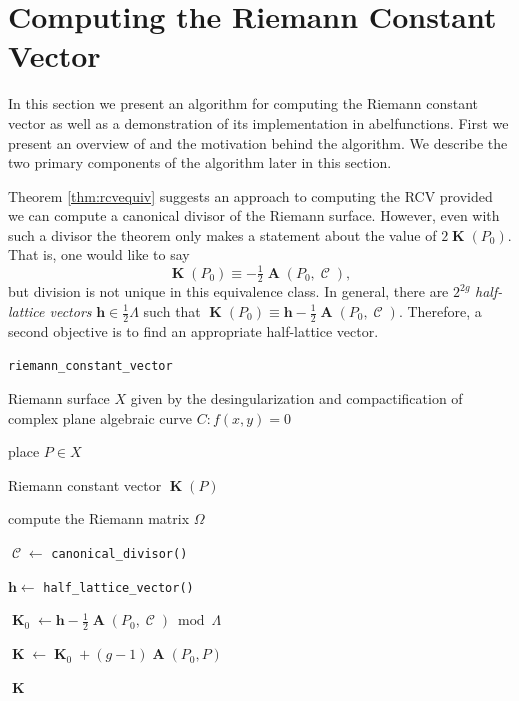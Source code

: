 \documentclass[12pt]{article}
\theoremstyle{definition}
\DeclareMathOperator{\DivC}{\mathcal{C}}
\DeclareMathOperator{\RCV}{\boldsymbol{K}}
\DeclareMathOperator{\Abel}{\boldsymbol{A}}
\begin{document}
\section{Computing the Riemann Constant Vector}





In this section we present an algorithm for computing the Riemann
constant vector as well as a demonstration of its implementation in {\sc
  abelfunctions}. First we present an overview of and the motivation
behind the algorithm. We describe the two primary components of the
algorithm later in this section.

Theorem \ref{thm:rcvequiv} suggests an approach to computing the RCV
provided we can compute a canonical divisor of the Riemann
surface. However, even with such a divisor the theorem only makes a
statement about the value of $2\RCV(P_0)$. That is, one would like to
say
\begin{equation}
\RCV(P_0) \equiv - \tfrac{1}{2} \Abel(P_0,\DivC),
\end{equation}
but division is not unique in this equivalence class. In general, there
are $2^{2g}$ {\it half-lattice vectors} $\boldsymbol{h} \in
\tfrac{1}{2}\Lambda$ such that $\RCV(P_0) \equiv \boldsymbol{h} -
\tfrac{1}{2}\Abel(P_0,\DivC)$. Therefore, a second objective is to find
an appropriate half-lattice vector.

\begin{algorithm}[H]
\caption{\tt riemann\_constant\_vector}
\label{alg:rcv}
\begin{algorithmic}[1]
  \Require Riemann surface $X$ given by the desingularization and
  compactification of complex plane algebraic curve $C : f(x,y) = 0$

  \Require place $P \in X$

  \Ensure Riemann constant vector $\RCV(P)$

  \State compute the Riemann matrix $\Omega$

  \State $\DivC \gets$ \verb=canonical_divisor()=

  \State $\boldsymbol{h} \gets$ \verb=half_lattice_vector()=

  \State $\RCV_0 \gets \boldsymbol{h} - \tfrac{1}{2}\Abel(P_0,\DivC)
  \bmod{\Lambda}$

  \State $\RCV \gets \RCV_0 + (g-1)\Abel(P_0,P)$

  \State \Return $\RCV$
\end{algorithmic}
\end{algorithm}
\end{document}
